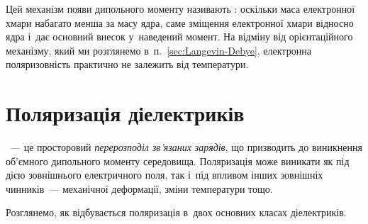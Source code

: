 Цей механізм появи дипольного моменту називають : оскільки маса електронної хмари набагато менша за масу ядра, саме зміщення
електронної хмари відносно ядра і~дає основний внесок у~наведений момент. На відміну від
орієнтаційного механізму, який ми розглянемо в~п.~\ref{sec:Langevin-Debye}, електронна
поляризовність практично не залежить від температури.


\section{Поляризація діелектриків}\hypertarget{dielectric-polarization}{}


\begin{Attention}
	~--- це просторовий \emph{перерозподіл зв'язаних зарядів}, що
	призводить до виникнення об'ємного дипольного моменту середовища. Поляризація може
	виникати як під дією зовнішнього електричного поля, так і~під впливом інших зовнішніх
	чинників~--- механічної деформації, зміни температури тощо.
\end{Attention}

Розглянемо, як відбувається поляризація в~двох основних класах діелектриків.

